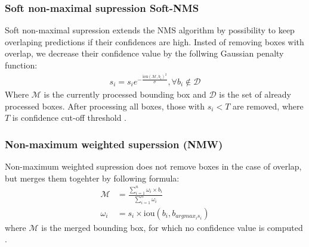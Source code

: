 \subsubsection{Soft non-maximal supression {Soft-NMS}}
Soft non-maximal supression extends the NMS algorithm by possibility to keep overlaping predictions if their confidences are high. Insted of removing boxes with overlap, we decrease their confidence value by the follwing Gaussian penalty function:
\begin{align}
    s_i = s_i e^{-\frac{\text{iou}\left( \mathcal{M}, b_i \right)^2}{\sigma}}, \forall b_i \notin \mathcal{D}
\end{align}
Where $\mathcal{M}$ is the currently processed bounding box and $\mathcal{D}$ is the set of already processed boxes. After processing all boxes, those with $s_i < T$ are removed, where $T$ is confidence cut-off threshold \cite{Bodla2017}.

\subsubsection{Non-maximum weighted superssion (NMW)}
Non-maximum weighted supression does not remove boxes in the case of overlap, but merges them togehter by following formula:
\begin{align}
    \mathcal{M} & = \frac{\sum_{i=1}^n \omega_i \times b_i}{\sum_{i=1}^n \omega_i} \\
    \omega_i    & = s_i \times \text{iou} \left( b_i, b_{ argmax_i s_i} \right)
\end{align}
where $\mathcal{M}$ is the merged bounding box, for which no confidence value is computed \cite{Zhou2017,Solovyev2019}.

